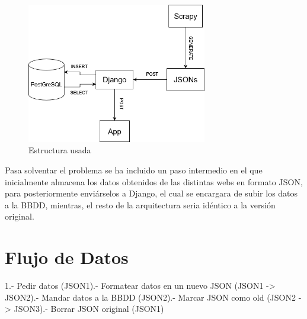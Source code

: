 \begin{figure} [H]
	\centering
	\includegraphics[width=0.7\textwidth]{fig/estructura_usada.png}
	\caption[Estructura de datos usada en el proyecto]{Estructura usada}
	\label{fig:ej10}
\end{figure}

Pasa solventar el problema se ha incluido un paso intermedio en el que inicialmente almacena los datos obtenidos de las distintas webs en formato JSON, para posteriormente enviárselos a Django, el cual se encargara de subir los datos a la BBDD, mientras, el resto de la arquitectura seria idéntico a la versión original.

\section{Flujo de Datos}
1.- Pedir datos (JSON1).- Formatear datos en un nuevo JSON (JSON1 -> JSON2).- Mandar datos a la BBDD (JSON2).- Marcar JSON como old (JSON2 -> JSON3).- Borrar JSON original (JSON1)\newline

